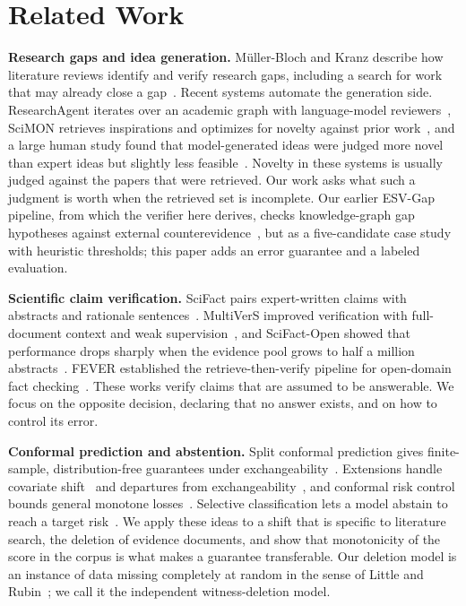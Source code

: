 \documentclass[conference,a4paper]{IEEEtran}
\theoremstyle{definition}
\begin{document}
\section{Related Work}
\textbf{Research gaps and idea generation.} M\"uller-Bloch and Kranz describe how literature reviews identify and verify research gaps, including a search for work that may already close a gap~\cite{mullerbloch2015}. Recent systems automate the generation side. ResearchAgent iterates over an academic graph with language-model reviewers~\cite{baek2025}, SciMON retrieves inspirations and optimizes for novelty against prior work~\cite{wang2024scimon}, and a large human study found that model-generated ideas were judged more novel than expert ideas but slightly less feasible~\cite{si2025}. Novelty in these systems is usually judged against the papers that were retrieved. Our work asks what such a judgment is worth when the retrieved set is incomplete. Our earlier ESV-Gap pipeline, from which the verifier here derives, checks knowledge-graph gap hypotheses against external counterevidence~\cite{le2027esvgap}, but as a five-candidate case study with heuristic thresholds; this paper adds an error guarantee and a labeled evaluation.

\textbf{Scientific claim verification.} SciFact pairs expert-written claims with abstracts and rationale sentences~\cite{wadden2020}. MultiVerS improved verification with full-document context and weak supervision~\cite{wadden2022multivers}, and SciFact-Open showed that performance drops sharply when the evidence pool grows to half a million abstracts~\cite{wadden2022open}. FEVER established the retrieve-then-verify pipeline for open-domain fact checking~\cite{thorne2018}. These works verify claims that are assumed to be answerable. We focus on the opposite decision, declaring that no answer exists, and on how to control its error.

\textbf{Conformal prediction and abstention.} Split conformal prediction gives finite-sample, distribution-free guarantees under exchangeability~\cite{vovk2005,lei2018,angelopoulos2023}. Extensions handle covariate shift~\cite{tibshirani2019} and departures from exchangeability~\cite{barber2023}, and conformal risk control bounds general monotone losses~\cite{angelopoulos2024crc}. Selective classification lets a model abstain to reach a target risk~\cite{geifman2017}. We apply these ideas to a shift that is specific to literature search, the deletion of evidence documents, and show that monotonicity of the score in the corpus is what makes a guarantee transferable. Our deletion model is an instance of data missing completely at random in the sense of Little and Rubin~\cite{little2019}; we call it the independent witness-deletion model.
\end{document}
